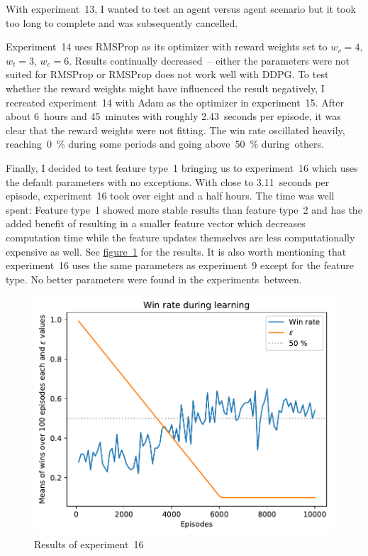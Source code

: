 \documentclass[a4paper,titlepage]{article}
\begin{document}
With experiment~13, I wanted to test an agent versus agent scenario but it took too long to complete and was subsequently cancelled.

Experiment~14 uses RMSProp as its optimizer with reward weights set to $w_v = 4$, $w_t = 3$, $w_c = 6$. Results continually decreased~-- either the parameters were not suited for RMSProp or RMSProp does not work well with DDPG. To test whether the reward weights might have influenced the result negatively, I recreated experiment~14 with Adam as the optimizer in experiment~15. After about 6~hours and 45~minutes with roughly 2.43~seconds per episode, it was clear that the reward weights were not fitting. The win rate oscillated heavily, reaching~0~\% during some periods and going above~50~\% during~others.

Finally, I decided to test feature type~1 bringing us to experiment~16  which uses the default parameters with no exceptions. With close to 3.11~seconds per episode, experiment~16 took over eight and a half hours. The time was well spent: Feature type~1 showed more stable results than feature type~2 and has the added benefit of resulting in a smaller feature vector which decreases computation time while the feature updates themselves are less computationally expensive as well. See \hyperref[fig:exp16]{figure~\ref*{fig:exp16}} for the results. It is also worth mentioning that experiment~16 uses the same parameters as experiment~9 except for the feature type. No better parameters were found in the experiments~between.
\begin{figure}
  \centering
  \includegraphics[width=\textwidth]{../experiments/exp16/win_stats.pdf}
  \caption{Results of experiment~16}
  \label{fig:exp16}
\end{figure}
\end{document}
